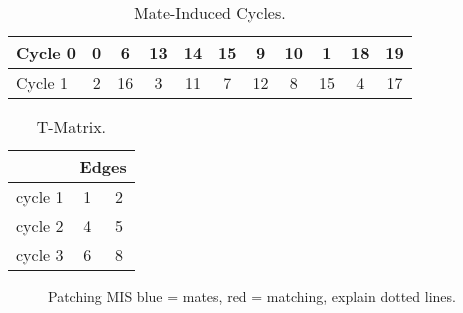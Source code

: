 \documentclass[a4paper, 11pt, twoside, onecolumn, openany]{article}
\begin{document}
\begin{table}[htb]
	\centering
	\begin{tabular}{|l*{10}{|c}|}
		\hline
		Cycle 0 & 0 & 6 & 13 & 14 & 15 & 9 & 10 & 1 & 18 & 19 \\ \hline
		Cycle 1 & 2 & 16 & 3 & 11 & 7 & 12 & 8 & 15 & 4 & 17 \\
		\hline
	\end{tabular}
	\caption{Mate-Induced Cycles.}	
\end{table}


\begin{table}[htb]
	\centering
	\begin{tabular}{c|c|c|}
		\cline{2-3}
		& \multicolumn{2}{|c|}{Edges} \\ \hline
		\multicolumn{1}{|c|}{cycle 1} & 1 & 2 \\ \hline
		\multicolumn{1}{|c|}{cycle 2} & 4 & 5 \\ \hline
		\multicolumn{1}{|c|}{cycle 3} & 6 & 8 \\
		\hline
	\end{tabular}
	\caption{T-Matrix.}
\end{table}	







\begin{figure}
	\centering
	
	\caption{Patching MIS blue = mates, red = matching, explain dotted lines.}	
\end{figure}
\end{document}
